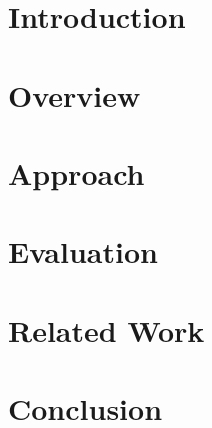 \documentclass[acmsmall,nonacm,review,anonymous]{acmart}
\begin{document}
\section{Introduction}
\label{sec:introduction}


\section{Overview}
\label{sec:overview}

\section{Approach}
\label{sec:approach}

\section{Evaluation}
\label{sec:evaluation}

\section{Related Work}
\label{sec:related_work}

\section{Conclusion}





\end{document}
